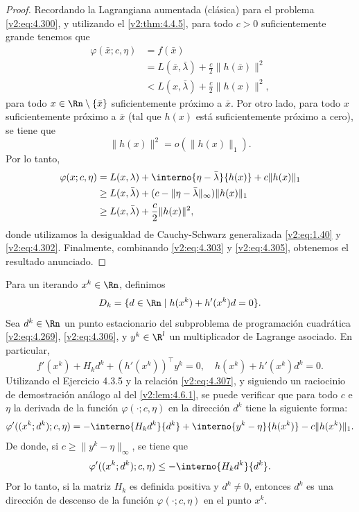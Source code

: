 \begin{proof}
Recordando la Lagrangiana aumentada (clásica) para el problema \eqref{v2:eq:4.300}, y utilizando el \cref{v2:thm:4.4.5}, para todo $c > 0$ suficientemente grande tenemos que
\begin{align}
\varphi(\bar{x}; c, \eta) &= f(\bar{x}) \nonumber \\
&= L(\bar{x}, \bar{\lambda}) + \frac{c}{2} \|h(\bar{x})\|^2 \nonumber \\
&< L(x, \bar{\lambda}) + \frac{c}{2} \|h(x)\|^2,
\label{v2:eq:4.303}
\end{align}
para todo $x \in \Rn \setminus \{\bar{x}\}$ suficientemente próximo a $\bar{x}$. Por otro lado, para todo $x$ suficientemente próximo a $\bar{x}$ (tal que $h(x)$ está suficientemente próximo a cero), se tiene que
\begin{equation}
\|h(x)\|^2 = o(\|h(x)\|_1).
\label{v2:eq:4.304}
\end{equation}
Por lo tanto,
\begin{align}
\varphi(x; c, \eta) &= L(x, \lambda) + \interno{\eta - \bar{\lambda}}{h(x)} + c \|h(x)\|_1 \nonumber \\
&\ge L(x, \bar{\lambda}) + (c - \|\eta - \bar{\lambda}\|_\infty)\|h(x)\|_1 \nonumber \\
&\ge L(x, \bar{\lambda}) + \frac{c}{2} \|h(x)\|^2,
\label{v2:eq:4.305}
\end{align}
donde utilizamos la desigualdad de Cauchy-Schwarz generalizada \eqref{v2:eq:1.40} y \eqref{v2:eq:4.302}. Finalmente, combinando \eqref{v2:eq:4.303} y \eqref{v2:eq:4.305}, obtenemos el resultado anunciado.
\end{proof}

Para un iterando $x^k \in \Rn$, definimos
\begin{equation}
D_k = \{ d \in \Rn \mid h(x^k) + h'(x^k)d = 0 \}.
\label{v2:eq:4.306}
\end{equation}
Sea $d^k \in \Rn$ un punto estacionario del subproblema de programación cuadrática \eqref{v2:eq:4.269}, \eqref{v2:eq:4.306}, y $y^k \in \R^l$ un multiplicador de Lagrange asociado. En particular,
\begin{equation}
f'(x^k) + H_k d^k + (h'(x^k))^\top y^k = 0, \quad h(x^k) + h'(x^k)d^k = 0.
\label{v2:eq:4.307}
\end{equation}
Utilizando el Ejercicio 4.3.5 y la relación \eqref{v2:eq:4.307}, y siguiendo un raciocinio de demostración análogo al del \cref{v2:lem:4.6.1}, se puede verificar que para todo $c$ e $\eta$ la derivada de la función $\varphi(\cdot; c, \eta)$ en la dirección $d^k$ tiene la siguiente forma:
\begin{equation}
\varphi'((x^k; d^k); c, \eta) = -\interno{H_k d^k}{d^k} + \interno{y^k - \eta}{h(x^k)} - c \|h(x^k)\|_1.
\label{v2:eq:4.308}
\end{equation}
De donde, si $c \ge \|y^k - \eta\|_\infty$, se tiene que
\begin{equation}
\varphi'((x^k; d^k); c, \eta) \le -\interno{H_k d^k}{d^k}.
\label{v2:eq:4.309}
\end{equation}
Por lo tanto, si la matriz $H_k$ es definida positiva y $d^k \neq 0$, entonces $d^k$ es una dirección de descenso de la función $\varphi(\cdot; c, \eta)$ en el punto $x^k$.

